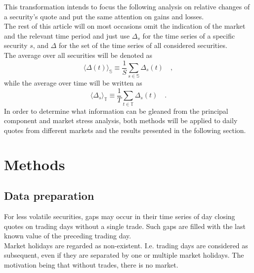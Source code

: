 \documentclass[11pt,twoside,a4paper]{article}
\begin{document}
This transformation intends to focus the following analysis on relative changes of a security's quote and put the same attention on gains and losses.\\
The rest of this article will on most occasions omit the indication of the market and the relevant time period and just use $\Delta_s$ for the time series of a specific security $s$, and $\Delta$ for the set of the time series of all considered securities.\\
The average over all securities will be denoted as
\begin{equation}
\langle\Delta(t)\rangle_\mathbb{S}\equiv\frac{1}{S}\sum_{s\in \mathbb{S}}\Delta_s(t)\quad,
\end{equation}
while the average over time will be written as
\begin{equation}
\langle\Delta_s\rangle_\mathbb{T}\equiv\frac{1}{T}\sum_{t\in \mathbb{T}}\Delta_s(t)\quad.
\end{equation}
In order to determine what information can be gleaned from the principal component and market stress analysis, both methods will be applied to daily quotes from different markets and the results presented in the following section.
\section{Methods}
\subsection{Data preparation}
For less volatile securities, gaps may occur in their time series of day closing quotes on trading days without a single trade. Such gaps are filled with the last known value of the preceding trading day.\\
Market holidays are regarded as non-existent. I.e. trading days are considered as subsequent, even if they are separated by one or multiple market holidays. The motivation being that without trades, there is no market.
\end{document}

